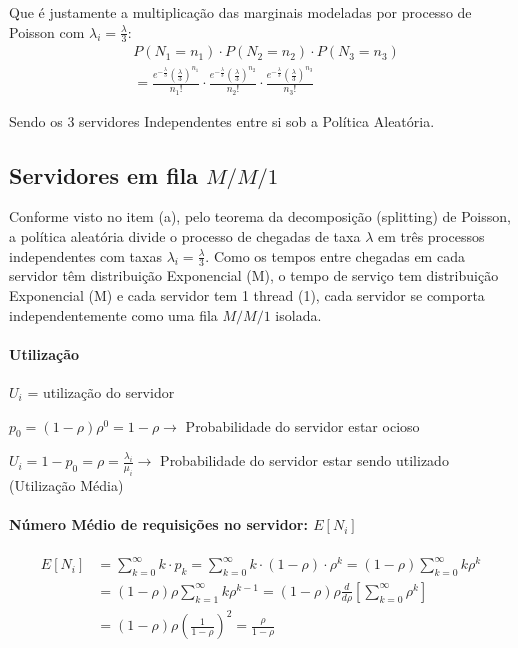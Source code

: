 \documentclass[conference]{IEEE_Conference_Template/IEEEtran}
\begin{document}
Que é justamente a multiplicação das marginais modeladas por processo de Poisson com $\lambda_i = \frac{\lambda}{3}$:
\begin{align}
&P(N_1 = n_1) \cdot P(N_2 = n_2) \cdot P(N_3 = n_3) \nonumber\\
&= \frac{e^{-\frac{\lambda}{3}} \left(\frac{\lambda}{3}\right)^{n_1}}{n_1!} \cdot \frac{e^{-\frac{\lambda}{3}} \left(\frac{\lambda}{3}\right)^{n_2}}{n_2!} \cdot \frac{e^{-\frac{\lambda}{3}} \left(\frac{\lambda}{3}\right)^{n_3}}{n_3!}
\end{align}

Sendo os 3 servidores Independentes entre si sob a Política Aleatória.

\subsection{Servidores em fila $M / M / 1$}

Conforme visto no item (a), pelo teorema da decomposição (splitting) de Poisson, a política aleatória divide o processo de chegadas de taxa $\lambda$ em três processos independentes com taxas $\lambda_i = \frac{\lambda}{3}$. Como os tempos entre chegadas em cada servidor têm distribuição Exponencial (M), o tempo de serviço tem distribuição Exponencial (M) e cada servidor tem 1 thread (1), cada servidor se comporta independentemente como uma fila $M/M/1$ isolada.

\paragraph{Utilização}
$U_i$ = utilização do servidor

$p_0 = (1 - \rho)\rho^0 = 1 - \rho \to$ Probabilidade do servidor estar ocioso

$U_i = 1 - p_0 = \rho = \frac{\lambda_i}{\mu_i} \to$ Probabilidade do servidor estar sendo utilizado (Utilização Média)

\paragraph{Número Médio de requisições no servidor: $E[N_i]$}
\begin{align}
E[N_i] &= \sum_{k=0}^{\infty} k \cdot p_k = \sum_{k=0}^{\infty} k \cdot (1 - \rho) \cdot \rho^k = (1 - \rho) \sum_{k=0}^{\infty} k \rho^k \nonumber\\
&= (1 - \rho)\rho \sum_{k=1}^{\infty} k \rho^{k-1} = (1 - \rho)\rho \frac{d}{d\rho} \left[ \sum_{k=0}^{\infty} \rho^k \right] \nonumber\\
&= (1 - \rho)\rho \left( \frac{1}{1-\rho} \right)^2 = \frac{\rho}{1 - \rho}
\end{align}
\end{document}
